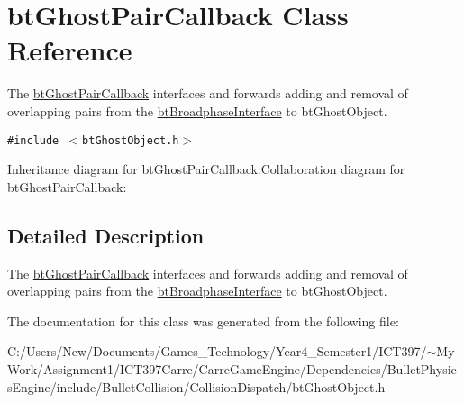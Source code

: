 \hypertarget{classbt_ghost_pair_callback}{
\section{btGhostPairCallback Class Reference}
\label{classbt_ghost_pair_callback}
}
The \hyperlink{classbt_ghost_pair_callback}{btGhostPairCallback} interfaces and forwards adding and removal of overlapping pairs from the \hyperlink{classbt_broadphase_interface}{btBroadphaseInterface} to btGhostObject.  


{\tt \#include $<$btGhostObject.h$>$}

Inheritance diagram for btGhostPairCallback:Collaboration diagram for btGhostPairCallback:

\subsection{Detailed Description}
The \hyperlink{classbt_ghost_pair_callback}{btGhostPairCallback} interfaces and forwards adding and removal of overlapping pairs from the \hyperlink{classbt_broadphase_interface}{btBroadphaseInterface} to btGhostObject. 

The documentation for this class was generated from the following file:\begin{CompactItemize}
\item 
C:/Users/New/Documents/Games\_\-Technology/Year4\_\-Semester1/ICT397/$\sim$My Work/Assignment1/ICT397Carre/CarreGameEngine/Dependencies/BulletPhysicsEngine/include/BulletCollision/CollisionDispatch/btGhostObject.h\end{CompactItemize}
